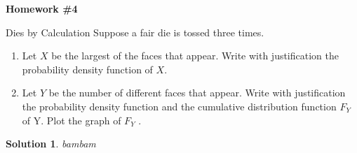 \documentclass[11pt]{article}
\newtheorem*{solution}{Solution}
\theoremstyle{mystyle}
\newtheorem{pproblem}{Problem}
\newcommand{\psettitle}[1]{
    \begin{center}
    \huge \textbf{#1}
    \end{center}
}
\begin{document}
\psettitle{Homework \#4}

\noindent

\begin{psproblem}{Dies by Calculation}{}
Suppose a fair die is tossed three times.
\begin{enumerate}[label=\alph*.]
\item Let $X$ be the largest of the faces that appear. Write with justification the probability density function of $X$.
\item Let $Y$ be the number of different faces that appear. Write with justification the probability density function
and the cumulative distribution function $F_Y$ of Y. Plot the graph of $F_Y$ .
\end{enumerate}
\end{psproblem}

\begin{solution}
bambam
\end{solution}




%
%
\end{document}
